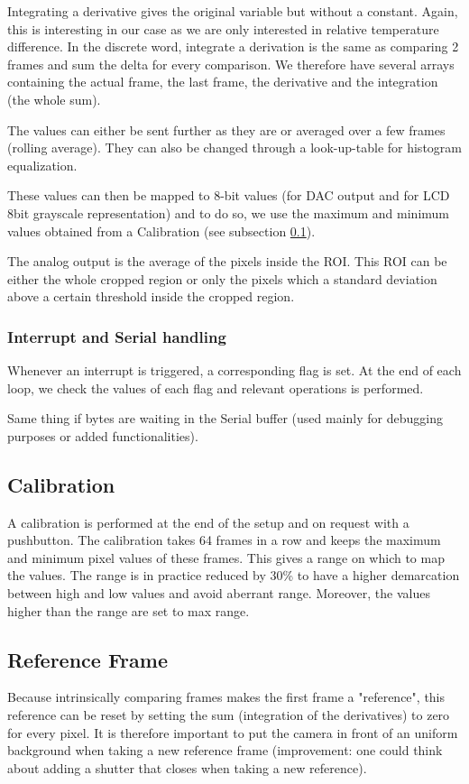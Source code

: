 \documentclass[a4paper]{article}
\begin{document}
Integrating a derivative gives the original variable but without a constant. Again, this is interesting in our case as we are only interested in relative temperature difference.
In the discrete word, integrate a derivation is the same as comparing 2 frames and sum the delta for every comparison.
We therefore have several arrays containing the actual frame, the last frame, the derivative and the integration (the whole sum).

The values can either be sent further as they are or averaged over a few frames (rolling average).
They can also be changed through a look-up-table for histogram equalization.

These values can then be mapped to 8-bit values (for DAC output and for LCD 8bit grayscale representation) and to do so, we use the maximum and minimum values obtained from a Calibration (see subsection \ref{calibration}).

The analog output is the average of the pixels inside the ROI. This ROI can be either the whole cropped region or only the pixels which a standard deviation above a certain threshold inside the cropped region. 

\subsubsection{Interrupt and Serial handling}
Whenever an interrupt is triggered, a corresponding flag is set. At the end of each loop, we check the values of each flag and relevant operations is performed.

Same thing if bytes are waiting in the Serial buffer (used mainly for debugging purposes or added functionalities).


\subsection{Calibration}
\label{calibration}
A calibration is performed at the end of the setup and on request with a pushbutton. The calibration takes 64 frames in a row and keeps the maximum and minimum pixel values of these frames. This gives a range on which to map the values. The range is in practice reduced by 30\% to have a higher demarcation between high and low values and avoid aberrant range. Moreover, the values higher than the range are set to max range.

\subsection{Reference Frame}
Because intrinsically comparing frames makes the first frame a "reference", this reference can be reset by setting the sum (integration of the derivatives) to zero for every pixel.
It is therefore important to put the camera in front of an uniform background when taking a new reference frame (improvement: one could think about adding a shutter that closes when taking a new reference). 
\end{document}
